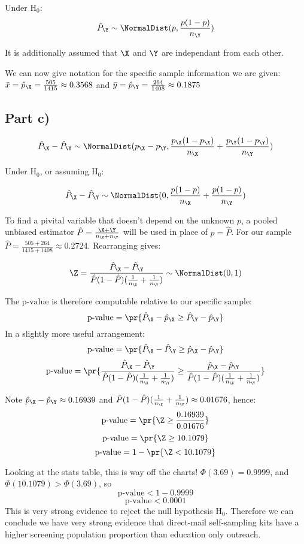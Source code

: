 Under $\text{H}_0$:
\[
\hat{P}_\Y \sim \NormalDist (p, \frac{p (1 - p)}{n_\Y})
\]

It is additionally assumed that $\X$ and $\Y$ are independant from each other.

We can now give notation for the specific sample information we are given:
$\bar{x} = \hat{p}_\X = \frac{505}{1415} \approx 0.3568$ and $\bar{y} = \hat{p}_\Y = \frac{264}{1408} \approx 0.1875$

\subsection{Part c)}

\[
\hat{P}_\X - \hat{P}_\Y \sim \NormalDist (p_\X - p_\Y, \frac{p_\X(1-p_\X)}{n_\X} + \frac{p_\Y(1-p_\Y)}{n_\Y})
\]

Under $\text{H}_0$, or assuming $\text{H}_0$:

\[
\hat{P}_\X - \hat{P}_\Y \sim \NormalDist (0, \frac{p(1-p)}{n_\X} + \frac{p(1-p)}{n_\Y})
\]

To find a pivital variable that doesn't depend on the unknown $p$, a pooled unbiased estimator $\hat{P} = \frac{\X + \Y}{n_\X + n_\Y}$
will be used in place of $p = \hat{P}$. For our sample $\hat{P} = \frac{505 + 264}{1415 + 1408} \approx 0.2724$. Rearranging gives:

\[
\Z = \frac{\hat{P}_\X - \hat{P}_\Y}{\hat{P}(1 - \hat{P})(\frac{1}{n_\X} + \frac{1}{n_\Y})} \sim \NormalDist(0, 1)
\]

The $\text{p-value}$ is therefore computable relative to our specific sample:
\[
\text{p-value} = \pr{\hat{P}_\X - \hat{p}_\X \geq \hat{P}_\Y - \hat{p}_\Y}
\]
In a slightly more useful arrangement:
\[
\text{p-value} = \pr{\hat{P}_\X - \hat{P}_\Y \geq \hat{p}_\X - \hat{p}_\Y}
\]
\[
\text{p-value} = \pr{
	\frac{\hat{P}_\X - \hat{P}_\Y}{\hat{P}(1 - \hat{P})(\frac{1}{n_\X} + \frac{1}{n_\Y})}
	\geq
	\frac{\hat{p}_\X - \hat{p}_\Y}{\hat{P}(1 - \hat{P})(\frac{1}{n_\X} + \frac{1}{n_\Y})}
}
\]

Note $\hat{p}_\X - \hat{p}_\Y \approx 0.16939$ and $\hat{P}(1 - \hat{P})(\frac{1}{n_\X} + \frac{1}{n_\Y}) \approx 0.01676$, hence:
\[
\text{p-value} = \pr{ \Z \geq \frac{0.16939}{0.01676}}
\]
\[
\text{p-value} = \pr{ \Z \geq 10.1079}
\]
\[
\text{p-value} = 1 - \pr{ \Z < 10.1079}
\]

Looking at the stats table, this is way off the charts! $\Phi(3.69) = 0.9999$, and $\Phi(10.1079) > \Phi(3.69)$, so
\[
\text{p-value} < 1 - 0.9999
\]
\[
\text{p-value} < 0.0001
\]
This is very strong evidence to reject the null hypothesis $\text{H}_0$.
Therefore we can conclude we have very strong evidence that direct-mail self-sampling kits have a higher screening population proportion than
education only outreach.

